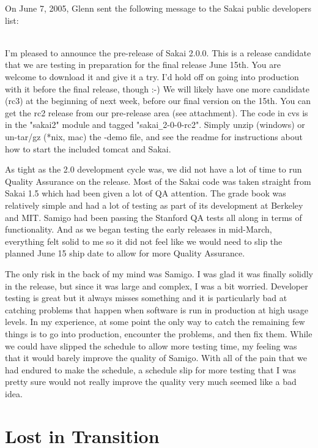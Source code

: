 \documentclass[12pt]{book}
\begin{document}
On June 7, 2005, Glenn sent the following message to the
Sakai public developers list:\\
\\
\begin{sf}
I'm pleased to announce the pre-release of Sakai 2.0.0.
This is a release candidate that we are testing in
preparation for the final release June 15th. You are
welcome to download it and give it a try. I'd hold off
on going into production with it before the final release,
though :-) We will likely have one more candidate (rc3)
at the beginning of next week, before our final version
on the 15th. You can get the rc2 release from our
pre-release area (see attachment). The code in cvs is in
the "sakai2" module and tagged "sakai\verb"_"2-0-0-rc2". Simply
unzip (windows) or un-tar/gz (*nix, mac) the -demo file,
and see the readme for instructions about how to start
the included tomcat and Sakai.\\
\end{sf}

As tight as the 2.0 development cycle was, we did not have
a lot of time to run Quality Assurance on the release.
Most of the Sakai code was taken straight from Sakai 1.5
which had been given a lot of QA attention.  The grade book
was relatively simple and had a lot of testing as part of its
development at Berkeley and MIT.   Samigo had been
passing the Stanford QA tests
all along in terms of functionality.  And as we began testing
the early releases in mid-March, everything felt solid
to me so it did not feel like we would need to slip
the planned June 15 ship date to allow for more Quality
Assurance.

The only risk in the back of my mind was Samigo.  I was glad
it was finally solidly in the release, but since it was
large and complex, I was a bit worried.  Developer testing is
great but it always misses something and it is particularly bad
at catching problems that happen when software is run in
production at high usage levels.  In my experience, at some point
the only way to catch the remaining few things is to go
into production, encounter the problems, and then fix them.
While we could have slipped the schedule to allow more
testing time, my feeling was that it would barely improve the
quality of Samigo.  With all of the pain that we had endured
to make the schedule, a schedule slip for more testing
that I was pretty sure would not really improve the quality
very much seemed like a bad idea.

\chapter{Lost in Transition}
\end{document}

